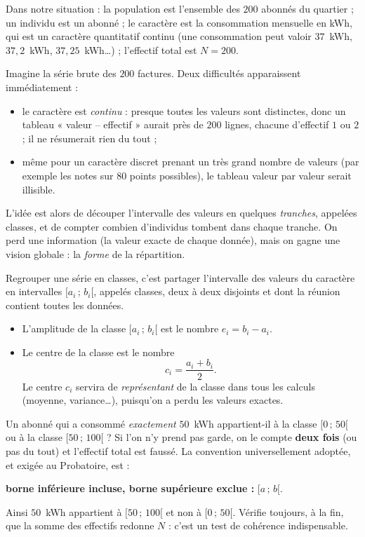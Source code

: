 \documentclass[11pt]{article}
\newcommand{\cle}[1]{{\popxbold\color{popdark}#1}}
\newcounter{popsec}
\newcounter{popsub}
\newcommand{\courssub}[1]{%
  \stepcounter{popsub}%
  \par\vspace{9pt}\noindent{\popxbold\fontsize{11.5}{13}\selectfont\color{popink}{\color{poporange}\thepopsec.\thepopsub}\hspace{6pt}#1}\par\nopagebreak\vspace{4pt}
}
\begin{document}
Dans notre situation : la population est l'ensemble des $200$ abonnés du quartier ; un individu est un abonné ; le caractère est la consommation mensuelle en kWh, qui est un caractère quantitatif continu (une consommation peut valoir $37$~kWh, $37{,}2$~kWh, $37{,}25$~kWh\dots) ; l'effectif total est $N = 200$.

\courssub{Pourquoi regrouper en classes ?}

Imagine la série brute des $200$ factures. Deux difficultés apparaissent immédiatement :
\begin{itemize}
\item le caractère est \emph{continu} : presque toutes les valeurs sont distinctes, donc un tableau « valeur -- effectif » aurait près de $200$ lignes, chacune d'effectif $1$ ou $2$ ; il ne résumerait rien du tout ;
\item même pour un caractère discret prenant un très grand nombre de valeurs (par exemple les notes sur $80$ points possibles), le tableau valeur par valeur serait illisible.
\end{itemize}

L'idée est alors de découper l'intervalle des valeurs en quelques \emph{tranches}, appelées \cle{classes}, et de compter combien d'individus tombent dans chaque tranche. On perd une information (la valeur exacte de chaque donnée), mais on gagne une vision globale : la \emph{forme} de la répartition.

\begin{definition}
Regrouper une série en \cle{classes}, c'est partager l'intervalle des valeurs du caractère en intervalles $[a_i\,;\,b_i[$, appelés classes, deux à deux disjoints et dont la réunion contient toutes les données.
\begin{itemize}
\item L'\cle{amplitude} de la classe $[a_i\,;\,b_i[$ est le nombre $e_i = b_i - a_i$.
\item Le \cle{centre} de la classe est le nombre
\[ c_i = \frac{a_i + b_i}{2}. \]
Le centre $c_i$ servira de \emph{représentant} de la classe dans tous les calculs (moyenne, variance\dots), puisqu'on a perdu les valeurs exactes.
\end{itemize}
\end{definition}

\begin{attention}
Un abonné qui a consommé \emph{exactement} $50$~kWh appartient-il à la classe $[0\,;\,50[$ ou à la classe $[50\,;\,100[$ ? Si l'on n'y prend pas garde, on le compte \textbf{deux fois} (ou pas du tout) et l'effectif total est faussé. La convention universellement adoptée, et exigée au Probatoire, est :
\begin{center}
\textbf{borne inférieure incluse, borne supérieure exclue :} $[a\,;\,b[$.
\end{center}
Ainsi $50$~kWh appartient à $[50\,;\,100[$ et non à $[0\,;\,50[$. Vérifie toujours, à la fin, que la somme des effectifs redonne $N$ : c'est un test de cohérence indispensable.
\end{attention}
\end{document}
